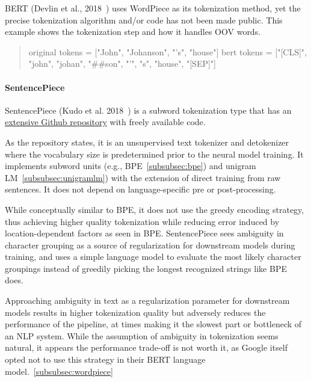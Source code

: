 BERT (Devlin et al., 2018~\cite{devlin2018bert}) uses WordPiece as its tokenization method, yet the precise tokenization algorithm and/or code has not been made public. This example shows the tokenization step and how it handles OOV words.

\begin{quote}
    original tokens = ["John", "Johanson", "'s",  "house"]
    bert tokens = ["[CLS]", "john", "johan", "\#\#son", "'", "s", "house", "[SEP]"]
\end{quote}

\paragraph{SentencePiece}

SentencePiece (Kudo et al. 2018~\cite{kudo2018sentencepiece}) is a subword tokenization type that has an \href{https://github.com/google/sentencepiece}{extensive Github repository} with freely available code.

As the repository states, it is an unsupervised text tokenizer and detokenizer where the vocabulary size is predetermined prior to the neural model training. It implements subword units (e.g., BPE~\ref{subsubsec:bpe}) and unigram LM~\ref{subsubsec:unigramlm}) with the extension of direct training from raw sentences. It does not depend on language-specific pre or post-processing.

While conceptually similar to BPE, it does not use the greedy encoding strategy, thus achieving higher quality tokenization while reducing error induced by location-dependent factors as seen in BPE. SentencePiece sees ambiguity in character grouping as a source of regularization for downstream models during training, and uses a simple language model to evaluate the most likely character groupings instead of greedily picking the longest recognized strings like BPE does.

Approaching ambiguity in text as a regularization parameter for downstream models results in higher tokenization quality but adversely reduces the performance of the pipeline, at times making it the slowest part or bottleneck of an NLP system. While the assumption of ambiguity in tokenization seems natural, it appears the performance trade-off is not worth it, as Google itself opted not to use this strategy in their BERT language model.~\ref{subsubsec:wordpiece}

